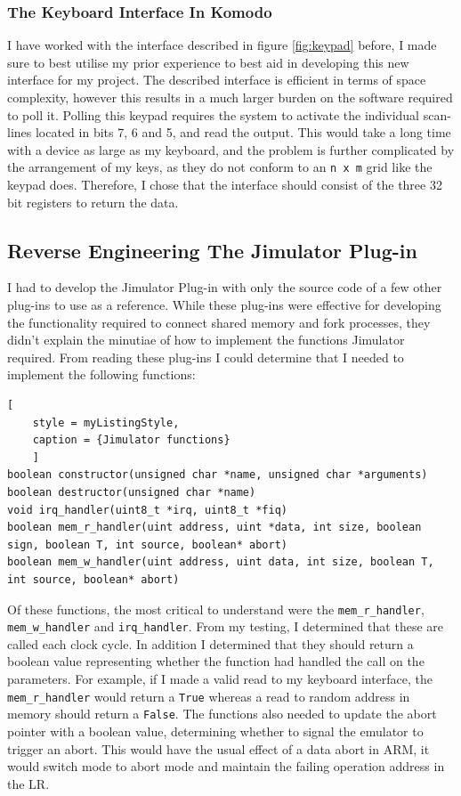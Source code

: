 \subsubsection{The Keyboard Interface In Komodo}
I have worked with the interface described in figure \ref{fig:keypad} before, I made sure to best utilise my prior experience to best aid in developing this new interface for my project. The described interface is efficient in terms of space complexity, however this results in a much larger burden on the software required to poll it. Polling this keypad requires the system to activate the individual scan-lines located in bits 7, 6 and 5, and read the output. This would take a long time with a device as large as my keyboard, and the problem is further complicated by the arrangement of my keys, as they do not conform to an \verb|n x m| grid like the keypad does. Therefore, I chose that the interface should consist of the three 32 bit registers to return the data. 


\subsection{Reverse Engineering The Jimulator Plug-in}
I had to develop the Jimulator Plug-in with only the source code of a few other plug-ins to use as a reference. While these plug-ins were effective for developing the functionality required to connect shared memory and fork processes, they didn't explain the minutiae of how to implement the functions Jimulator required. From reading these plug-ins I could determine that I needed to implement the following functions:
\begin{lstlisting}[
	style = myListingStyle,
	caption = {Jimulator functions}
	]
boolean constructor(unsigned char *name, unsigned char *arguments)
boolean destructor(unsigned char *name)
void irq_handler(uint8_t *irq, uint8_t *fiq)
boolean mem_r_handler(uint address, uint *data, int size, boolean sign, boolean T, int source, boolean* abort)
boolean mem_w_handler(uint address, uint data, int size, boolean T, int source, boolean* abort)
\end{lstlisting}

Of these functions, the most critical to understand were the \verb|mem_r_handler|, \verb|mem_w_handler| and \verb|irq_handler|. From my testing, I determined that these are called each clock cycle. In addition I determined that they should return a boolean value representing whether the function had handled the call on the parameters. For example, if I made a valid read to my keyboard interface, the \verb|mem_r_handler| would return a \verb|True| whereas a read to random address in memory should return a \verb|False|. The functions also needed to update the abort pointer with a boolean value, determining whether to signal the emulator to trigger an abort. This would have the usual effect of a data abort in ARM, it would switch mode to abort mode and maintain the failing operation address in the LR.



